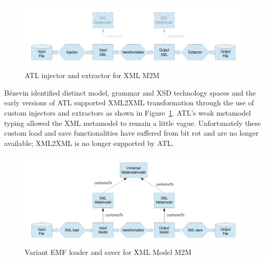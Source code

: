 \documentclass{llncs}
\begin{document}
\begin{figure}
	\begin{center}
		\includegraphics[width=4.9in]{ATLXMLM2M.png}
	\end{center}
	\caption{ATL injector and extractor for XML M2M}
	\label{fig:ATLXMLM2M}
\end{figure}

B\'ezevin \cite{TechnologySpace} identified distinct model, grammar and XSD technology spaces and the early versions of ATL \cite{Eclipse-ATL} supported XML2XML transformation through the use of custom injectors and extractors as shown in Figure~\ref{fig:ATLXMLM2M}. ATL's weak metamodel typing allowed the XML metamodel to remain a little vague. Unfortunately these custom load and save functionalities have suffered from bit rot and are no longer available; XML2XML is no longer supported by ATL. 


\begin{figure}
	\begin{center}
		\includegraphics[width=4.9in]{XMLM2M.png}
	\end{center}
	\caption{Variant EMF loader and saver for XML Model M2M}
	\label{fig:XMLM2M}
\end{figure}
\end{document}
